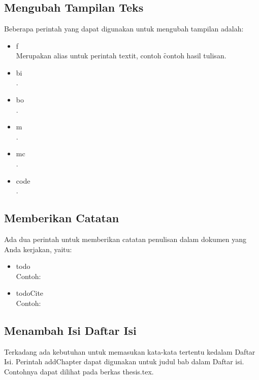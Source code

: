 \chapter{\babLima}

\section{Mengubah Tampilan Teks}

Beberapa perintah yang dapat digunakan untuk mengubah tampilan adalah: 
\begin{itemize}
	\item \bslash f \\
		Merupakan alias untuk perintah \bslash textit, contoh 
		\f{contoh hasil tulisan}.
	\item \bslash bi \\
		.
	\item \bslash bo \\
		.
	\item \bslash m \\
		.
	\item \bslash mc \\
		.
	\item \bslash code \\ 
		.
\end{itemize}

\section{Memberikan Catatan}

Ada dua perintah untuk memberikan catatan penulisan dalam dokumen yang Anda kerjakan, yaitu: 
\begin{itemize}
	\item \bslash todo \\
		Contoh: \\ 
	\item \bslash todoCite \\ 
		Contoh: \todoCite
\end{itemize}

\section{Menambah Isi Daftar Isi}

Terkadang ada kebutuhan untuk memasukan kata-kata tertentu kedalam Daftar Isi. Perintah \bslash addChapter dapat digunakan untuk judul bab dalam Daftar isi. Contohnya dapat dilihat pada berkas thesis.tex.


